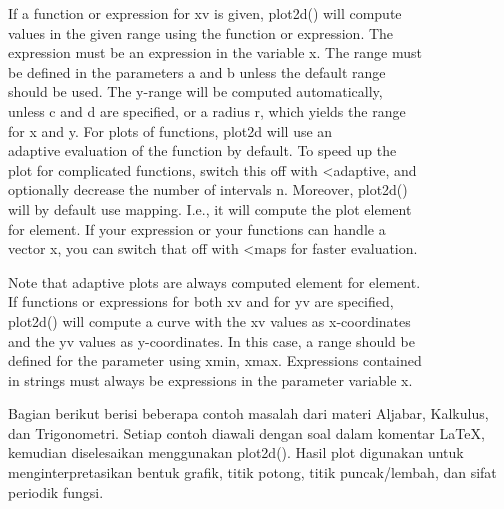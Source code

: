 \documentclass[a4paper,10pt]{article}
\begin{document}
\begin{eulernotebook}
\begin{eulercomment}
\begin{eulercomment}
\begin{eulercomment}
\begin{eulercomment}
\begin{eulercomment}
If a function or expression for xv is given, plot2d() will compute\\
values in the given range using the function or expression. The\\
expression must be an expression in the variable x. The range must\\
be defined in the parameters a and b unless the default range\\
[-2,2] should be used. The y-range will be computed automatically,\\
unless c and d are specified, or a radius r, which yields the range\\
[-r,r] for x and y. For plots of functions, plot2d will use an\\
adaptive evaluation of the function by default. To speed up the\\
plot for complicated functions, switch this off with \textless{}adaptive, and\\
optionally decrease the number of intervals n. Moreover, plot2d()\\
will by default use mapping. I.e., it will compute the plot element\\
for element. If your expression or your functions can handle a\\
vector x, you can switch that off with \textless{}maps for faster evaluation.

Note that adaptive plots are always computed element for element. \\
If functions or expressions for both xv and for yv are specified,\\
plot2d() will compute a curve with the xv values as x-coordinates\\
and the yv values as y-coordinates. In this case, a range should be\\
defined for the parameter using xmin, xmax. Expressions contained\\
in strings must always be expressions in the parameter variable x.\\
\begin{eulercomment}
\begin{eulercomment}
Bagian berikut berisi beberapa contoh masalah dari materi Aljabar, Kalkulus,
dan Trigonometri. Setiap contoh diawali dengan soal dalam komentar LaTeX,
kemudian diselesaikan menggunakan plot2d(). Hasil plot digunakan untuk
menginterpretasikan bentuk grafik, titik potong, titik puncak/lembah,
dan sifat periodik fungsi.


\end{eulercomment}
\end{eulercomment}
\end{eulercomment}
\end{eulercomment}
\end{eulercomment}
\end{eulercomment}
\end{eulercomment}
\end{eulernotebook}
\end{document}
